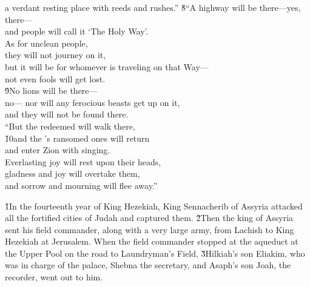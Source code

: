 \begin{poetry}
\poemll    a verdant resting place with reeds and rushes.''
\poeml \v{8}``A highway will be there---yes, there--- \\
\poemll    and people will call it `The Holy Way'. \\
\poeml As for unclean people, \\
\poemll    they will not journey on it, \\
\poeml but it will be for whomever is traveling on that Way--- \\
\poemlll       not even fools will get lost. \\
\poeml \v{9}No lions will be there--- \\
\poemll    no--- nor will any ferocious beasts get up on it, \\
\poemlll       and they will not be found there. \\
\poeml ``But the redeemed will walk there, \\
\poeml \v{10}and the 's ransomed ones will return \\
\poemlll       and enter Zion with singing. \\
\poeml Everlasting joy will rest upon their heads, \\
\poemll    gladness and joy will overtake them, \\
\poemlll       and sorrow and mourning will flee away.''
\end{poetry}

\v{1}In the fourteenth year of King Hezekiah, King Sennacherib of Assyria attacked all the fortified cities of Judah and captured them. \v{2}Then the king of Assyria sent his field commander, along with a very large army, from Lachish to King Hezekiah at Jerusalem. When the field commander stopped at the aqueduct at the Upper Pool on the road to Laundryman's Field, \v{3}Hilkiah's son Eliakim, who was in charge of the palace, Shebna the secretary, and Asaph's son Joah, the recorder, went out to him.

